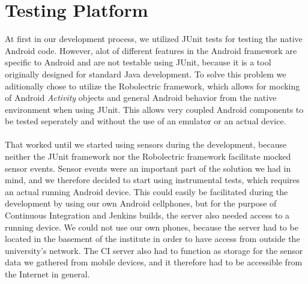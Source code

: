 \section{Testing Platform}
\label{sub:testing_platform}

At first in our development process, we utilized JUnit tests for testing the native Android code. However, alot of different features in the Android framework are specific to Android and are not testable using JUnit, because it is a tool originally designed for standard Java development. To solve this problem we aditionally chose to utilize the Robolectric framework, which allows for mocking of Android \emph{Activity} objects and general Android behavior from the native environment when using JUnit. This allows very coupled Android components to be tested seperately and without the use of an emulator or an actual device. 
\\\\
That worked until we started using sensors during the development, because neither the JUnit framework nor the Robolectric framework facilitate mocked sensor events. Sensor events were an important part of the solution we had in mind, and we therefore decided to start using instrumental tests, which requires an actual running Android device. This could easily be facilitated during the development by using our own Android cellphones, but for the purpose of Continuous Integration and Jenkins builds, the server also needed access to a running device. We could not use our own phones, because the server had to be located in the basement of the institute in order to have access from outside the university's network. The CI server also had to function as storage for the sensor data we gathered from mobile devices, and it therefore had to be accessible from the Internet in general.
\\\\
